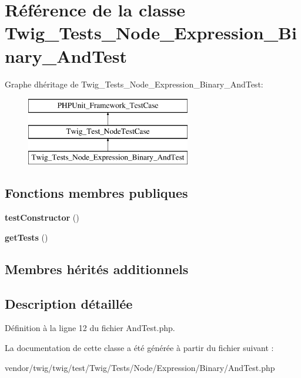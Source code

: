 \hypertarget{class_twig___tests___node___expression___binary___and_test}{}\section{Référence de la classe Twig\+\_\+\+Tests\+\_\+\+Node\+\_\+\+Expression\+\_\+\+Binary\+\_\+\+And\+Test}
\label{class_twig___tests___node___expression___binary___and_test}
Graphe d\textquotesingle{}héritage de Twig\+\_\+\+Tests\+\_\+\+Node\+\_\+\+Expression\+\_\+\+Binary\+\_\+\+And\+Test\+:\begin{figure}[H]
\begin{center}
\leavevmode
\includegraphics[height=3.000000cm]{class_twig___tests___node___expression___binary___and_test}
\end{center}
\end{figure}
\subsection*{Fonctions membres publiques}
\begin{DoxyCompactItemize}
\item 
{\bfseries test\+Constructor} ()\hypertarget{class_twig___tests___node___expression___binary___and_test_a47094dc941e72950570900d1418f89c6}{}\label{class_twig___tests___node___expression___binary___and_test_a47094dc941e72950570900d1418f89c6}

\item 
{\bfseries get\+Tests} ()\hypertarget{class_twig___tests___node___expression___binary___and_test_a7e247dd31cc8d37a6c97353a062a0080}{}\label{class_twig___tests___node___expression___binary___and_test_a7e247dd31cc8d37a6c97353a062a0080}

\end{DoxyCompactItemize}
\subsection*{Membres hérités additionnels}


\subsection{Description détaillée}


Définition à la ligne 12 du fichier And\+Test.\+php.



La documentation de cette classe a été générée à partir du fichier suivant \+:\begin{DoxyCompactItemize}
\item 
vendor/twig/twig/test/\+Twig/\+Tests/\+Node/\+Expression/\+Binary/And\+Test.\+php\end{DoxyCompactItemize}

